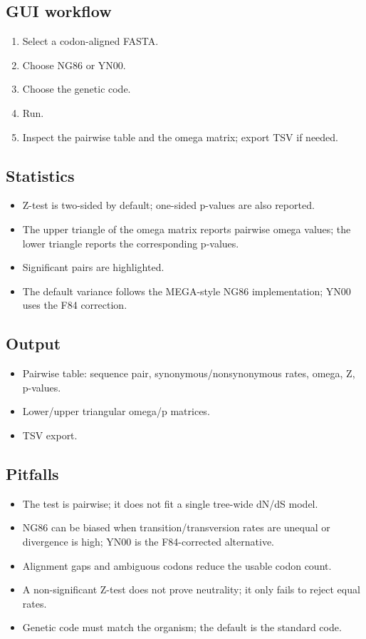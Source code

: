 \documentclass[11pt]{report}
\begin{document}
\subsection{GUI workflow}

\begin{enumerate}
  \item Select a codon-aligned FASTA.
  \item Choose NG86 or YN00.
  \item Choose the genetic code.
  \item Run.
  \item Inspect the pairwise table and the omega matrix; export TSV if needed.
\end{enumerate}

\subsection{Statistics}

\begin{itemize}
  \item Z-test is two-sided by default; one-sided p-values are also reported.
  \item The upper triangle of the omega matrix reports pairwise omega values; the lower triangle reports the corresponding p-values.
  \item Significant pairs are highlighted.
  \item The default variance follows the MEGA-style NG86 implementation; YN00 uses the F84 correction.
\end{itemize}

\subsection{Output}

\begin{itemize}
  \item Pairwise table: sequence pair, synonymous/nonsynonymous rates, omega, Z, p-values.
  \item Lower/upper triangular omega/p matrices.
  \item TSV export.
\end{itemize}

\subsection{Pitfalls}

\begin{itemize}
  \item The test is pairwise; it does not fit a single tree-wide dN/dS model.
  \item NG86 can be biased when transition/transversion rates are unequal or divergence is high; YN00 is the F84-corrected alternative.
  \item Alignment gaps and ambiguous codons reduce the usable codon count.
  \item A non-significant Z-test does not prove neutrality; it only fails to reject equal rates.
  \item Genetic code must match the organism; the default is the standard code.
\end{itemize}
\end{document}
